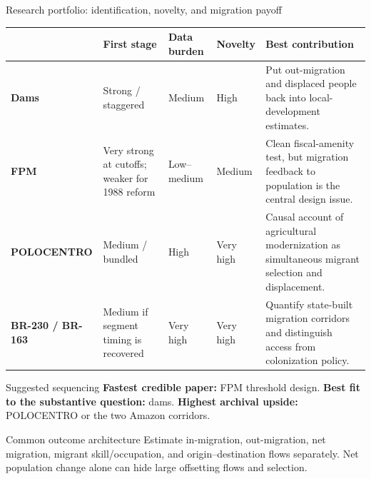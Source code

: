 \documentclass[aspectratio=169,10pt]{beamer}
\begin{document}
\begin{frame}{Research portfolio: identification, novelty, and migration payoff}
\small
\renewcommand{\arraystretch}{1.28}
\begin{tabularx}{\textwidth}{L{2.5cm}L{2.2cm}L{2.2cm}L{2.2cm}Y}
\toprule
 & \textbf{First stage} & \textbf{Data burden} & \textbf{Novelty} & \textbf{Best contribution} \\
\midrule
\textbf{Dams} & Strong / staggered & Medium & High & Put out-migration and displaced people back into local-development estimates. \\
\textbf{FPM} & Very strong at cutoffs; weaker for 1988 reform & Low--medium & Medium & Clean fiscal-amenity test, but migration feedback to population is the central design issue. \\
\textbf{POLOCENTRO} & Medium / bundled & High & Very high & Causal account of agricultural modernization as simultaneous migrant selection and displacement. \\
\textbf{BR-230 / BR-163} & Medium if segment timing is recovered & Very high & Very high & Quantify state-built migration corridors and distinguish access from colonization policy. \\
\bottomrule
\end{tabularx}
\vspace{0.55em}
\begin{block}{Suggested sequencing}
\textbf{Fastest credible paper:} FPM threshold design. \quad
\textbf{Best fit to the substantive question:} dams. \quad
\textbf{Highest archival upside:} POLOCENTRO or the two Amazon corridors.
\end{block}
\begin{alertblock}{Common outcome architecture}
Estimate in-migration, out-migration, net migration, migrant skill/occupation, and origin--destination flows separately. Net population change alone can hide large offsetting flows and selection.
\end{alertblock}
\end{frame}

\end{document}
